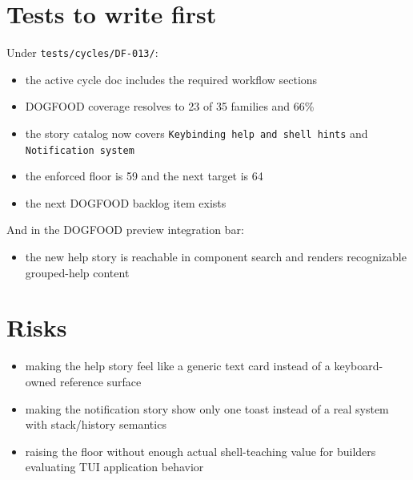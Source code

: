 \section{Tests to write first}\label{record-075-tests-to-write-first}

Under \texttt{t\allowbreak{}e\allowbreak{}s\allowbreak{}t\allowbreak{}s\allowbreak{}/\allowbreak{}c\allowbreak{}y\allowbreak{}c\allowbreak{}l\allowbreak{}e\allowbreak{}s\allowbreak{}/\allowbreak{}D\allowbreak{}F\allowbreak{}-\allowbreak{}0\allowbreak{}1\allowbreak{}3\allowbreak{}/}:

\begin{itemize}
\tightlist
\item
  the active cycle doc includes the required workflow sections
\item
  DOGFOOD coverage resolves to 23 of 35 families and 66\%
\item
  the story catalog now covers \texttt{K\allowbreak{}e\allowbreak{}y\allowbreak{}b\allowbreak{}i\allowbreak{}n\allowbreak{}d\allowbreak{}i\allowbreak{}n\allowbreak{}g\allowbreak{} \allowbreak{}h\allowbreak{}e\allowbreak{}l\allowbreak{}p\allowbreak{} \allowbreak{}a\allowbreak{}n\allowbreak{}d\allowbreak{} \allowbreak{}s\allowbreak{}h\allowbreak{}e\allowbreak{}l\allowbreak{}l\allowbreak{} \allowbreak{}h\allowbreak{}i\allowbreak{}n\allowbreak{}t\allowbreak{}s} and \texttt{N\allowbreak{}o\allowbreak{}t\allowbreak{}i\allowbreak{}f\allowbreak{}i\allowbreak{}c\allowbreak{}a\allowbreak{}t\allowbreak{}i\allowbreak{}o\allowbreak{}n\allowbreak{} \allowbreak{}s\allowbreak{}y\allowbreak{}s\allowbreak{}t\allowbreak{}e\allowbreak{}m}
\item
  the enforced floor is 59 and the next target is 64
\item
  the next DOGFOOD backlog item exists
\end{itemize}

And in the DOGFOOD preview integration bar:

\begin{itemize}
\tightlist
\item
  the new help story is reachable in component search and renders recognizable grouped-help content
\end{itemize}

\section{Risks}\label{record-075-risks}

\begin{itemize}
\tightlist
\item
  making the help story feel like a generic text card instead of a keyboard-owned reference surface
\item
  making the notification story show only one toast instead of a real system with stack/history semantics
\item
  raising the floor without enough actual shell-teaching value for builders evaluating TUI application behavior
\end{itemize}

